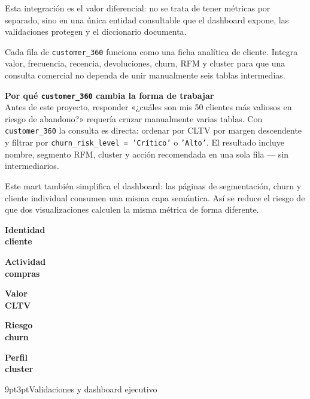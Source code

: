 \documentclass[10pt,a4paper]{article}
\makeatletter
\renewcommand\section{\@startsection{section}{1}{0pt}
  {9pt}{3pt}{\large\bfseries\color{accent}}}
\newenvironment{mdframed}[1][]{
  \par\vspace{3pt}\noindent
  \begin{lrbox}{\calloutbox}
  \begin{minipage}{0.94\textwidth}
}{
  \end{minipage}
  \end{lrbox}
  \begingroup
  \setlength{\fboxsep}{8pt}
  \colorbox{calloutbg}{\usebox{\calloutbox}}
  \endgroup
  \par\vspace{3pt}
}
\newcommand{\MiniBox}[2]{%
  \colorbox{rowodd}{\begin{minipage}{#1}\centering\scriptsize\textbf{\color{accent}#2}\end{minipage}}}
\makeatother
\begin{document}
\vspace{6pt}
Esta integración es el valor diferencial: no se trata de tener métricas por
separado, sino en una única entidad consultable que el dashboard expone,
las validaciones protegen y el diccionario documenta.

Cada fila de \texttt{customer\_360} funciona como una ficha analítica de
cliente. Integra valor, frecuencia, recencia, devoluciones, churn, RFM y cluster
para que una consulta comercial no dependa de unir manualmente seis tablas
intermedias.

\begin{mdframed}[style=cbox]
\textbf{\color{accent}Por qué \texttt{customer\_360} cambia la forma de trabajar}\\[2pt]
Antes de este proyecto, responder «¿cuáles son mis 50 clientes más valiosos
en riesgo de abandono?» requería cruzar manualmente varias tablas. Con
\texttt{customer\_360} la consulta es directa: ordenar por CLTV por margen
descendente y filtrar por
\texttt{churn\_risk\_level = 'Crítico'} o \texttt{'Alto'}.
El resultado incluye nombre, segmento RFM, cluster y acción recomendada
en una sola fila --- sin intermediarios.
\end{mdframed}

\vspace{3pt}
Este mart también simplifica el dashboard: las páginas de segmentación, churn y
cliente individual consumen una misma capa semántica. Así se reduce el riesgo
de que dos visualizaciones calculen la misma métrica de forma diferente.

\vspace{5pt}
\begin{center}
\MiniBox{2.0cm}{Identidad\\cliente}
\hspace{4pt}
\MiniBox{2.0cm}{Actividad\\compras}
\hspace{4pt}
\MiniBox{2.0cm}{Valor\\CLTV}
\hspace{4pt}
\MiniBox{2.0cm}{Riesgo\\churn}
\hspace{4pt}
\MiniBox{2.0cm}{Perfil\\cluster}
\end{center}

\section{Validaciones y dashboard ejecutivo}
\end{document}
